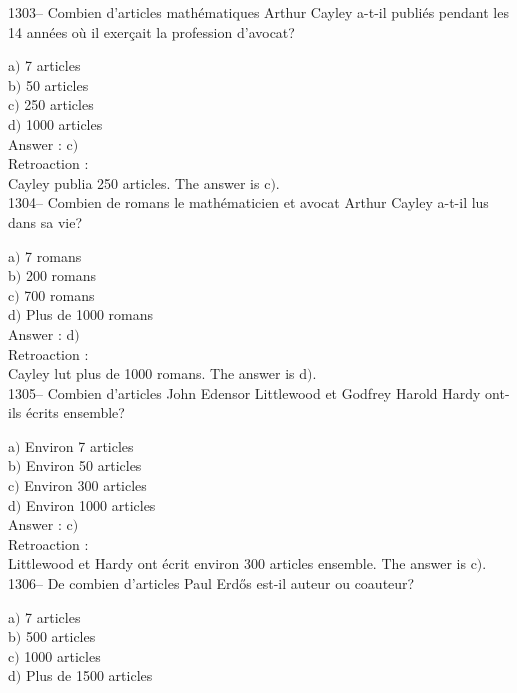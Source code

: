 ﻿\documentclass[letterpaper, 12pt]{article}
\begin{document}
1303-- Combien d'articles math\'ematiques Arthur Cayley a-t-il
publi\'es pendant les 14 ann\'ees o\`u il exer\c cait la profession
d'avocat?

a$)$ 7 articles \\
b$)$ 50 articles \\
c$)$ 250 articles\\
d$)$ 1000 articles\\

Answer : c$)$\\

Retroaction : \\
Cayley publia 250 articles.
The answer is  c$)$.\\

1304-- Combien de romans le math\'ematicien et avocat Arthur Cayley
a-t-il lus dans sa vie?

a$)$ 7 romans \\
b$)$ 200 romans \\
c$)$ 700 romans\\
d$)$ Plus de 1000 romans\\

Answer : d$)$\\

Retroaction : \\
Cayley lut plus de 1000 romans.
The answer is  d$)$.\\

1305-- Combien d'articles John Edensor Littlewood et Godfrey Harold
Hardy ont-ils \'ecrits ensemble?

a$)$ Environ 7 articles \\
b$)$ Environ 50 articles \\
c$)$ Environ 300 articles\\
d$)$ Environ 1000 articles\\

Answer : c$)$\\

Retroaction : \\
Littlewood et Hardy ont \'ecrit environ 300 articles ensemble.
The answer is  c$)$.\\

1306-- De combien d'articles Paul Erd\H{o}s est-il auteur ou
coauteur?

a$)$ 7 articles \\
b$)$ 500 articles \\
c$)$ 1000 articles\\
d$)$ Plus de 1500 articles\\
\end{document}
